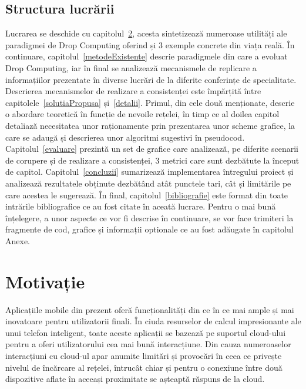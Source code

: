 \documentclass[12pt,a4paper]{report}
\begin{document}
\section{Structura lucrării}
Lucrarea se deschide cu capitolul~\ref{motivatie}, acesta sintetizează numeroase utilități ale paradigmei de Drop Computing oferind și 3 exemple concrete din viața reală. În continuare, capitolul~\ref{metodeExistente} descrie paradigmele din care a evoluat Drop Computing, iar în final se analizează mecanismele de replicare a informațiilor prezentate în diverse lucrări de la diferite conferințe de specialitate. Descrierea mecanismelor de realizare a consistenței este împărțită între capitolele~\ref{solutiaPropusa} și~\ref{detalii}. Primul, din cele două menționate, descrie o abordare teoretică în funcție de nevoile rețelei, în timp ce al doilea capitol detaliază necesitatea unor raționamente prin prezentarea unor scheme grafice, la care se adaugă și descrierea unor algoritmi sugestivi în pseudocod. Capitolul~\ref{evaluare} prezintă un set de grafice care analizează, pe diferite scenarii de corupere și de realizare a consistenței, 3 metrici care sunt dezbătute la început de capitol.
Capitolul~\ref{concluzii} sumarizează implementarea întregului proiect și analizează rezultatele obținute dezbătând atât punctele tari, cât și limitările pe care acestea le sugerează. În final, capitolul~\ref{bibliografie} este format din toate intrările bibliografice ce au fost citate în aceată lucrare. Pentru o mai bună înțelegere, a unor aspecte ce vor fi descrise în continuare, se vor face trimiteri la fragmente de cod, grafice și informații optionale ce au fost adăugate în capitolul Anexe. 


\chapter{Motivație} \label{motivatie}

Aplicațiile mobile din prezent oferă funcționalități din ce în ce mai ample și mai inovatoare pentru utilizatorii finali. În ciuda resurselor de calcul impresionante ale unui telefon inteligent, toate aceste aplicații se bazează pe suportul cloud-ului pentru a oferi utilizatorului cea mai bună interacțiune. Din cauza numeroaselor interacțiuni cu cloud-ul apar anumite limitări și provocări în ceea ce privește nivelul de încărcare al rețelei, întrucât chiar și pentru o conexiune între două dispozitive aflate în aceeași proximitate se așteaptă răspuns de la cloud.
\end{document}
